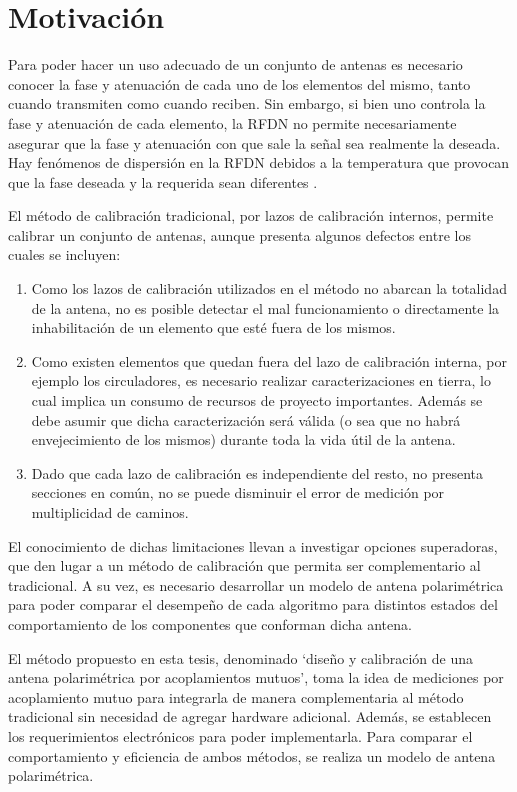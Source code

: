 \section{Motivación} \label{sc:motivation}

Para poder hacer un uso adecuado de un conjunto de antenas es necesario conocer la fase y atenuación de cada uno de los elementos
del mismo, tanto cuando transmiten como cuando reciben. Sin embargo, si bien uno controla la fase y atenuación de cada elemento,
la RFDN no permite necesariamente asegurar que la fase y atenuación con que sale la señal sea realmente la deseada. Hay 
fenómenos de dispersión en la RFDN debidos a la temperatura que provocan que la fase deseada y la requerida sean diferentes 
\cite{Keizer2011}.

El método de calibración tradicional, por lazos de calibración internos, permite calibrar un conjunto de antenas, aunque
presenta algunos defectos entre los cuales se incluyen:

\begin{enumerate}
    \item Como los lazos de calibración utilizados en el método no abarcan la totalidad de la antena, no es posible detectar el
		mal funcionamiento o directamente la inhabilitación de un elemento que esté fuera de los mismos. 
    \item Como existen elementos que quedan fuera del lazo de calibración interna, por ejemplo los circuladores, es necesario
		realizar caracterizaciones en tierra, lo cual implica un consumo de recursos de proyecto importantes. Además se debe 
		asumir que dicha caracterización será válida (o sea que no habrá envejecimiento de los mismos) durante toda la vida útil
		de la antena.
    \item Dado que cada lazo de calibración es independiente del resto, no presenta secciones en común, no se puede disminuir
		el error de medición por multiplicidad de caminos.
\end{enumerate}

El conocimiento de dichas limitaciones llevan a investigar opciones superadoras, que den lugar a un método de calibración que 
permita ser complementario al tradicional. A su vez, es necesario desarrollar un modelo de antena polarimétrica para poder 
comparar el desempeño de cada algoritmo para distintos estados del comportamiento de los componentes que conforman dicha antena.

El método propuesto en esta tesis, denominado \enquote*{diseño y calibración de una antena polarimétrica por acoplamientos
mutuos}, toma la idea de mediciones por acoplamiento mutuo \cite{Agrawal2003}\cite{Shipley2000}\cite{Aumann1989}\cite{Chen2012}
para integrarla de manera complementaria al método tradicional sin necesidad de agregar hardware adicional. Además, se establecen
los requerimientos electrónicos para poder implementarla. Para comparar el comportamiento y eficiencia de ambos métodos, se
realiza un modelo de antena polarimétrica.


